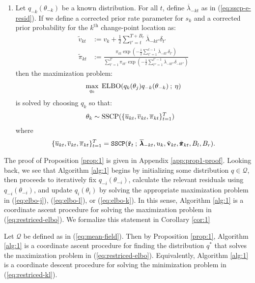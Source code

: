 \begin{proposition}
\begin{enumerate}[label=\roman*.]
    \item Let $q_{-k}(\theta_{-k})$ be a known distribution. For all $t$, define $\overline{\lambda}_{-kt}$ as in (\ref{eq:sscp-e-resid}). If we define a corrected prior rate parameter for $s_k$ and a corrected prior probability for the $k^{\text{th}}$ change-point location as:
    \begin{align}
        \tilde{v}_{kt} &:= v_k + \frac{1}{2}\sum_{t'=t}^{T+B_r}\overline{\lambda}_{-kt'}\delta_{t'} \label{eq:mod-v_k} \\
        \tilde{\pi}_{kt} &:= \frac{\pi_{kt} \exp\left(-\frac{1}{2}\sum_{t'=1}^{t-1}\overline{\lambda}_{-kt'}\delta_{t'}\right)}{\sum_{t'=1}^T \pi_{kt'} \exp\left(-\frac{1}{2}\sum_{t''=1}^{t'-1}\overline{\lambda}_{-kt''}\delta_{-kt''}\right)} \label{eq:mod-pi_k}
    \end{align}
    then the maximization problem:
    \begin{align}
        \normalfont
        \max_{q_k} \;\text{ELBO}(q_k(\theta_j)q_{-k}(\theta_{-k}) \:;\: \eta) \label{eq:elbo-k}
    \end{align}
    is solved by choosing $q_k$ so that: 
    \begin{align*}
        \normalfont
        \theta_k &\sim \normalfont \text{SSCP}(\{\overline{u}_{kt}, \overline{v}_{kt}, \overline{\pi}_{kt}\}_{t=1}^T)
    \end{align*}
    where 
    \begin{align*}
        \normalfont
        \{\overline{u}_{kt}, \overline{v}_{kt}, \overline{\pi}_{kt}\}_{t=1}^T = \texttt{SSCP}(\tilde{\mathbf{r}}_{t} \:;\: \overline{\pmb{\lambda}}_{-kt}, u_k, \tilde{\mathbf{v}}_{kt}, \tilde{\pmb{\pi}}_{kt}, B_l,B_r).
    \end{align*}
\end{enumerate}
\end{proposition}
The proof of Proposition \ref{prop:1} is given in Appendix \ref{app:prop1-proof}. Looking back, we see that Algorithm \ref{alg:1} begins by initializing some distribution $q \in \mathcal{Q}$, then proceeds to iteratively fix $q_{-i}(\theta_{-i})$, calculate the relevant residuals using $q_{-i}(\theta_{-i})$, and update $q_{i}(\theta_{i})$ by solving the appropriate maximization problem in (\ref{eq:elbo-j}), (\ref{eq:elbo-l}), or (\ref{eq:elbo-k}). In this sense, Algorithm \ref{alg:1} is a coordinate ascent procedure for solving the maximization problem in (\ref{eq:restriced-elbo}). We formalize this statement in Corollary \ref{cor:1}
\begin{corollary}
\label{cor:1} 
Let $\mathcal{Q}$ be defined as in (\ref{eq:mean-field}). Then by Proposition \ref{prop:1}, Algorithm \ref{alg:1} is a coordinate ascent procedure for finding the distribution $q^*$ that solves the maximization problem in (\ref{eq:restriced-elbo}). Equivalently, Algorithm \ref{alg:1} is a coordinate descent procedure for solving the minimization problem in (\ref{eq:restriced-kl}).
\end{corollary}
